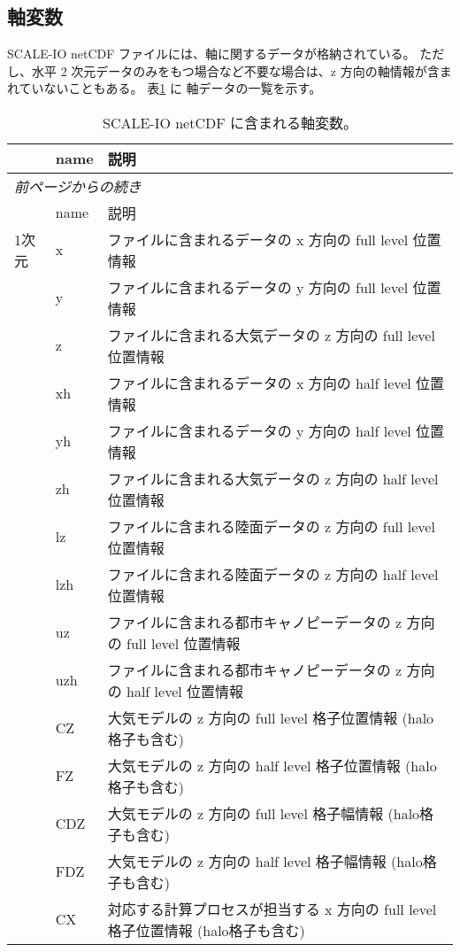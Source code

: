 \subsection{軸変数}
SCALE-IO netCDF ファイルには、軸に関するデータが格納されている。
ただし、水平 2 次元データのみをもつ場合など不要な場合は、z 方向の軸情報が含まれていないこともある。
表\ref{table:netcdf_axes} に 軸データの一覧を示す。
\begin{longtable}{|l|ll|}
  \caption{SCALE-IO netCDF に含まれる軸変数。}
  \label{table:netcdf_axes} \\ \hline
  & name & 説明 \\ \hline \hline
  \endfirsthead
  \multicolumn{3}{l}{\small\it 前ページからの続き} \\ \hline
  & name & 説明 \\ \hline \hline
  \endhead
  \hline
  \endfoot
    1次元
    & x & ファイルに含まれるデータの x 方向の full level 位置情報 \\
    & y & ファイルに含まれるデータの y 方向の full level 位置情報 \\
    & z & ファイルに含まれる大気データの z 方向の full level 位置情報 \\
    & xh & ファイルに含まれるデータの x 方向の half level 位置情報 \\
    & yh & ファイルに含まれるデータの y 方向の half level 位置情報 \\
    & zh & ファイルに含まれる大気データの z 方向の half level 位置情報 \\
    & lz & ファイルに含まれる陸面データの z 方向の full level 位置情報 \\
    & lzh & ファイルに含まれる陸面データの z 方向の half level 位置情報 \\
    & uz & ファイルに含まれる都市キャノピーデータの z 方向の full level 位置情報 \\
    & uzh & ファイルに含まれる都市キャノピーデータの z 方向の half level 位置情報 \\
    & CZ & 大気モデルの z 方向の full level 格子位置情報 (halo格子も含む) \\
    & FZ & 大気モデルの z 方向の half level 格子位置情報 (halo格子も含む) \\
    & CDZ & 大気モデルの z 方向の full level 格子幅情報 (halo格子も含む) \\
    & FDZ & 大気モデルの z 方向の half level 格子幅情報 (halo格子も含む) \\
    & CX & 対応する計算プロセスが担当する x 方向の full level 格子位置情報 (halo格子も含む) \\

\end{longtable}
